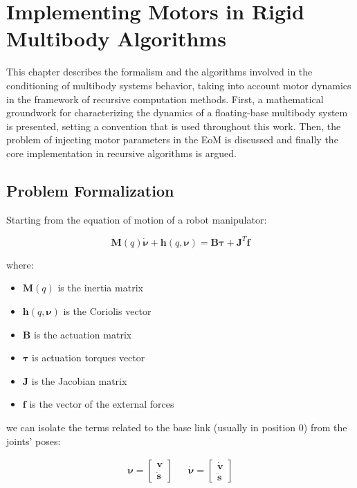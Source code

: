\chapter{Implementing Motors in Rigid Multibody Algorithms}
\label{chp:06-MotDyn}

This chapter describes the formalism and the algorithms involved in the conditioning of multibody systems behavior, taking into account motor dynamics in the framework of recursive computation methods. First, a mathematical groundwork for characterizing the dynamics of a floating-base multibody system is presented, setting a convention that is used throughout this work. Then, the problem of injecting motor parameters in the \ac{EoM} is discussed and finally the core implementation in recursive algorithms is argued.

\section{Problem Formalization}

Starting from the equation of motion of a robot manipulator:

\begin{equation}
    \mathbf{M}(q)\dot{\boldsymbol{\nu}} + \mathbf{h}(q,\boldsymbol{\nu}) = \mathbf{B}\boldsymbol{\tau} + \mathbf{J} ^T \mathbf{f}
\end{equation}

where:

\begin{itemize}
    \item $\mathbf{M}(q)$ is the inertia matrix
    \item $\mathbf{h}(q,\boldsymbol{\nu})$ is the Coriolis vector
    \item $\mathbf{B}$ is the actuation matrix
    \item $\boldsymbol{\tau}$ is actuation torques vector
    \item $\mathbf{J}$ is the Jacobian matrix
    \item $\mathbf{f}$ is the vector of the external forces
\end{itemize}

we can isolate the terms related to the base link (usually in position 0) from the joints' poses:

\begin{align}
    \boldsymbol{\nu} =
    \begin{bmatrix}
        \mathrm{\mathbf{v}} \\
        \dot{\mathbf{s}}
    \end{bmatrix} &  &
    \dot{\boldsymbol{\nu}} =
    \begin{bmatrix}
        \dot{\mathrm{\mathbf{v}}} \\
        \ddot{\mathbf{s}}
    \end{bmatrix}
\end{align}

